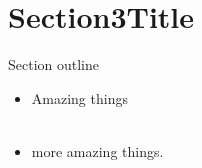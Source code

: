\section{Section3Title}

\begin{frame}{Section outline}
	\begin{itemize}
		\item Amazing things \\~\\
		\item more amazing things.
	\end{itemize}
\end{frame}
